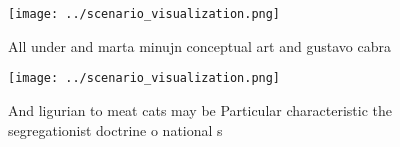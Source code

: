 \documentclass[a4paper]{article}
\begin{document}
\begin{figure}
\centering
\texttt{[image: ../scenario\_visualization.png]}
\caption{All under and marta minujn conceptual art and gustavo cabra
}
\end{figure}
 
\begin{figure}
\centering
\texttt{[image: ../scenario\_visualization.png]}
\caption{And ligurian to meat cats may be Particular characteristic the segregationist doctrine o national s
}
\end{figure}
 
\end{document}
